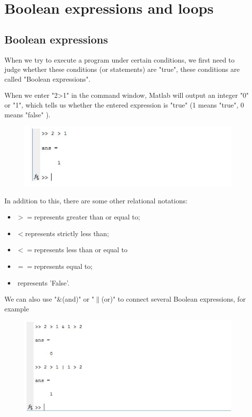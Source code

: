 \documentclass[10pt,math=newtx,citestyle=gb7714-2015,bibstyle=gb7714-2015]{elegantbook}
\begin{document}
{{{	\section{Boolean expressions and loops}
	\subsection{Boolean expressions}
	When we try to execute a program under certain conditions, we first need to judge whether these conditions (or statements) are "true", these conditions are called "Boolean expressions".
	
	When we enter "2>1" in the command window, Matlab will output an integer "0" or "1", which tells us whether the entered expression is "true" (1 means "true", 0 means "false" ).
	\begin{figure}[htbp!]
		\centering
		\includegraphics[width=0.8\linewidth]{FIG/Boolean}
		\centering
	\end{figure}
	
	In addition to this, there are some other relational notations:
	
	\begin{itemize}
		\item $>=$represents greater than or equal to;
		\item $<$represents strictly less than;
		\item $<=$represents less than or equal to
		\item $==$represents equal to;
		\item $~$represents 'False'.
	\end{itemize}
	
	We can also use "$\&$(and)" or "$\|$(or)" to connect several Boolean expressions, for example
	\begin{figure}[htbp!]
		\centering
		\includegraphics[width=0.8\linewidth]{FIG/connecting}
		\centering
	\end{figure}
	
}}}
\end{document}
